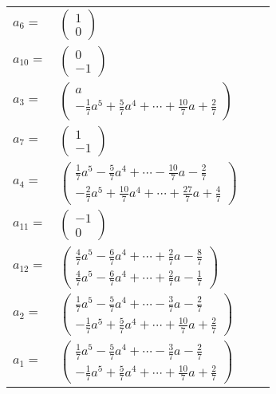 \documentclass[1p]{elsarticle_modified}
\theoremstyle{definition}
\begin{document}
\begin{tabular}{m{7pt} m{180pt} m{7pt} m{180pt} }
\flushright $a_{6}=$&$\begin{pmatrix}1\\0\end{pmatrix}$ \\
\flushright $a_{10}=$&$\begin{pmatrix}0\\-1\end{pmatrix}$ \\
\flushright $a_{3}=$&$\begin{pmatrix}a\\-\frac{1}{7} a^5+\frac{5}{7} a^4+\cdots+\frac{10}{7} a+\frac{2}{7}\end{pmatrix}$ \\
\flushright $a_{7}=$&$\begin{pmatrix}1\\-1\end{pmatrix}$ \\
\flushright $a_{4}=$&$\begin{pmatrix}\frac{1}{7} a^5-\frac{5}{7} a^4+\cdots-\frac{10}{7} a-\frac{2}{7}\\-\frac{2}{7} a^5+\frac{10}{7} a^4+\cdots+\frac{27}{7} a+\frac{4}{7}\end{pmatrix}$ \\
\flushright $a_{11}=$&$\begin{pmatrix}-1\\0\end{pmatrix}$ \\
\flushright $a_{12}=$&$\begin{pmatrix}\frac{4}{7} a^5-\frac{6}{7} a^4+\cdots+\frac{2}{7} a-\frac{8}{7}\\\frac{4}{7} a^5-\frac{6}{7} a^4+\cdots+\frac{2}{7} a-\frac{1}{7}\end{pmatrix}$ \\
\flushright $a_{2}=$&$\begin{pmatrix}\frac{1}{7} a^5-\frac{5}{7} a^4+\cdots-\frac{3}{7} a-\frac{2}{7}\\-\frac{1}{7} a^5+\frac{5}{7} a^4+\cdots+\frac{10}{7} a+\frac{2}{7}\end{pmatrix}$ \\
\flushright $a_{1}=$&$\begin{pmatrix}\frac{1}{7} a^5-\frac{5}{7} a^4+\cdots-\frac{3}{7} a-\frac{2}{7}\\-\frac{1}{7} a^5+\frac{5}{7} a^4+\cdots+\frac{10}{7} a+\frac{2}{7}\end{pmatrix}$ \\

\end{tabular}
\end{document}
